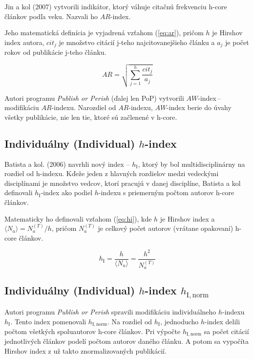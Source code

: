 Jin a kol (2007) vytvorili indikátor, ktorý váhuje citačnú frekvenciu h-core
článkov podľa veku.  Nazvali ho $\mathit{AR}$-index.

Jeho matematická definícia je vyjadrená vzťahom (\ref{eq:ar}), pričom $h$ je
Hirshov index autora, $\mathit{cit}_j$ je množstvo citácií j-teho
najcitovanejšieho článku a $a_j$ je počet rokov od publikácie j-teho článku.

\begin{equation}
\label{eq:ar}
\mathit{AR} = \sqrt{\sum_{j=1}^h{\frac{\mathit{cit}_j}{a_j}}}
\end{equation}

Autori programu \emph{Publish or Perish} (ďalej len PoP) vytvorili
$\mathit{AW}$-index\,--\,modifikáciu $\mathit{AR}$-indexu.  Narozdiel od
$\mathit{AR}$-indexu, $\mathit{AW}$-index berie do úvahy všetky publikácie, nie
len tie, ktoré sú začlenené v h-core.


\subsection{Individuálny (Individual) $h$-index}

Batista a kol. (2006) navrhli nový index -- $h_{\mathrm{I}}$, ktorý by bol
multidisciplinárny na rozdiel od h-indexu.  Kďeže jeden z hlavných rozdielov
medzi vedeckými disciplínami je množstvo vedcov, ktorí pracujú v danej
disciplíne, Batista a kol definovali $h_{\mathrm{I}}$-index ako podiel
$h$-indexu s priemerným počtom autorov h-core článkov.

Matematicky ho definovali vzťahom (\ref{eq:hi}), kde $h$ je Hirshov index a
$\langle N_a \rangle = N_a^{(T)} / h$, pričom $N_a^{(T)}$ je celkový počet
autorov (vrátane opakovaní) h-core článkov.

\begin{equation}
\label{eq:hi}
h_{\mathrm{I}} = \frac{h}{\langle N_a \rangle} = \frac{h^2}{N_a^{(T)}}
\end{equation}


\subsection{Individuálny (Individual) $h$-index $h_{\mathrm{I, norm}}$}

Autori programu \emph{Publish or Perish} spravili modifikáciu individuálneho
$h$-indexu $h_{\mathrm{I}}$.  Tento index pomenovali $h_{\mathrm{I, norm}}$.  Na
rozdiel od $h_{\mathrm{I}}$, jednoducho $h$-index delili počtom všetkých
spoluautorov h-core článkov.  Pri výpočte $h_{\mathrm{I, norm}}$ sa počet
citácií jednotlivých článkov podelí počtom autorov daného článku.  A potom sa
vypočíta Hirshov index z už takto znormalizovaných publikácií.


